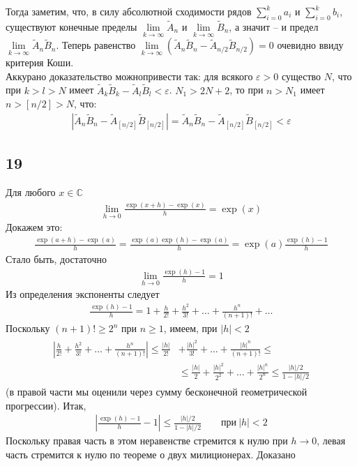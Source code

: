 		Тогда заметим, что, в силу абсолютной сходимости рядов $\sum_{i = 0}^{k} a_i$ и $\sum_{i = 0}^{k} b_i$, существуют конечные пределы $\lim\limits_{k \to \infty} \widetilde{A}_n$ и $\lim\limits_{k \to \infty} \widetilde{B}_n$, а значит -- и предел $\lim\limits_{k \to \infty} \widetilde{A}_n \widetilde{B}_n$. Теперь равенство $\lim\limits_{k \to \infty} (\widetilde{A}_n \widetilde{B}_n - \widetilde{A}_{n/2} \widetilde{B}_{n/2}) = 0$ очевидно ввиду критерия Коши.\\
		Аккурано доказательство можнопривести так: для всякого $\varepsilon > 0$ существо $N$, что при $k > l > N$ имеет $\tilde{A}_{k} \tilde{B}_{k} - \tilde{A}_{l} \tilde{B}_{l} < \varepsilon$. $N_1 > 2N + 2$, то при $n > N_1$ имеет $n > [n/2] > N$, что:
		\begin{gather*}
			\left|\tilde{A}_{n} \tilde{B}_{n}-\tilde{A}_{[n / 2]} \tilde{B}_{[n / 2]}\right|=\tilde{A}_{n} \tilde{B}_{n}-\tilde{A}_{[n / 2]} \tilde{B}_{[n / 2]}<\varepsilon
		\end{gather*}
		
		\subsection{19}
		Для любого $x \in \mathbb{C}$\\
		\begin{gather*}
			\lim _{h \rightarrow 0} \frac{\exp (x+h)-\exp (x)}{h}=\exp (x)
		\end{gather*}
		Докажем это:
		\begin{gather*}
			\frac{\exp (a+h)-\exp (a)}{h}=\frac{\exp (a) \exp (h)-\exp (a)}{h}=\exp (a) \frac{\exp (h)-1}{h}
		\end{gather*}
		Стало быть, достаточно
		\begin{gather*}
			\lim _{h \rightarrow 0} \frac{\exp (h)-1}{h}=1
		\end{gather*}
		Из определения экспоненты следует
		\begin{gather*}
			\frac{\exp (h)-1}{h}=1+\frac{h}{2 !}+\frac{h^{2}}{3 !}+\ldots+\frac{h^{n}}{(n+1) !}+\ldots
		\end{gather*}
		Поскольку $(n+1)! \geqslant 2^n$ при $n \geqslant 1$, имеем, при $|h| < 2$
		\begin{gather*}
			\begin{aligned}\left|\frac{h}{2 !}+\frac{h^{2}}{3 !}+\ldots+\frac{h^{n}}{(n+1) !}\right| \leqslant \frac{|h|}{2!} &+\frac{|h|^{2}}{3 !}+\ldots+\frac{|h|^{n}}{(n+1) !} \leqslant \\ & \leqslant \frac{|h|}{2}+\frac{|h|^{2}}{2^{2}}+\ldots+\frac{|h|^{n}}{2^{n}} \leqslant \frac{|h| / 2}{1-|h| / 2} \end{aligned}
		\end{gather*}
		(в правой части мы оценили через сумму бесконечной геометрической прогрессии). Итак,
		\begin{gather*}
			\left|\frac{\exp (h)-1}{h}-1\right| \leqslant \frac{|h| / 2}{1-|h| / 2} \qquad \text{при} \ |h| < 2
		\end{gather*}
		Поскольку правая часть в этом неравенстве стремится к нулю при $h \to 0$, левая часть стремится к нулю по теореме о двух милиционерах. Доказано\\
		
